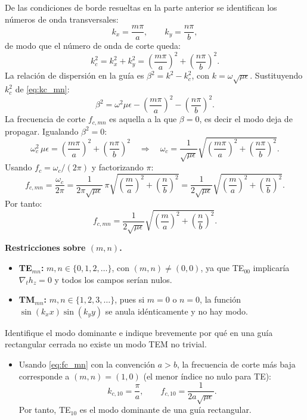 \documentclass[
  11pt,
  letterpaper,
   addpoints,
   answers
  ]{exam}
\begin{document}
\begin{questions}
\begin{parts}
\begin{subparts}
\begin{solution}
De las condiciones de borde resueltas en la parte anterior se identifican los números de onda transversales:
\[
k_x=\frac{m\pi}{a},\qquad k_y=\frac{n\pi}{b},
\]
de modo que el número de onda de corte queda:
\begin{equation}\label{eq:kc_mn}
  k_c^2 = k_x^2+k_y^2 = \left(\frac{m\pi}{a}\right)^2+\left(\frac{n\pi}{b}\right)^2.
\end{equation}
La relación de dispersión en la guía es $\beta^2=k^2-k_c^2$, con $k=\omega\sqrt{\mu\epsilon}$.
Sustituyendo $k_c^2$ de \eqref{eq:kc_mn}:
\[
\beta^2 = \omega^2\mu\epsilon - \left(\frac{m\pi}{a}\right)^2-\left(\frac{n\pi}{b}\right)^2.
\]
La frecuencia de corte $f_{c,mn}$ es aquella a la que $\beta=0$, es decir el modo deja de propagar.
Igualando $\beta^2=0$:
\[
\omega_c^2\,\mu\epsilon = \left(\frac{m\pi}{a}\right)^2+\left(\frac{n\pi}{b}\right)^2
\quad\Longrightarrow\quad
\omega_c = \frac{1}{\sqrt{\mu\epsilon}}\sqrt{\left(\frac{m\pi}{a}\right)^2+\left(\frac{n\pi}{b}\right)^2}.
\]
Usando $f_c=\omega_c/(2\pi)$ y factorizando $\pi$:
\[
f_{c,mn} = \frac{\omega_c}{2\pi}
= \frac{1}{2\pi\sqrt{\mu\epsilon}}\,\pi\sqrt{\left(\frac{m}{a}\right)^2+\left(\frac{n}{b}\right)^2}
= \frac{1}{2\sqrt{\mu\epsilon}}\sqrt{\left(\frac{m}{a}\right)^2+\left(\frac{n}{b}\right)^2}.
\]
Por tanto:
\begin{equation}\label{eq:fc_mn}
  \boxed{f_{c,mn}=\frac{1}{2\sqrt{\mu\epsilon}}
  \sqrt{\left(\frac{m}{a}\right)^2+\left(\frac{n}{b}\right)^2}.}
\end{equation}

\textbf{Restricciones sobre $(m,n)$.}
\begin{itemize}
\item \textbf{TE$_{mn}$:} $m,n\in\{0,1,2,\dots\}$, con $(m,n)\neq(0,0)$, ya que TE$_{00}$ implicaría $\nabla_t h_z=0$ y todos los campos serían nulos.
\item \textbf{TM$_{mn}$:} $m,n\in\{1,2,3,\dots\}$, pues si $m=0$ o $n=0$, la función $\sin(k_x x)\sin(k_y y)$ se anula idénticamente y no hay modo.
\end{itemize}
\end{solution}

\subpart Identifique el modo dominante e indique brevemente por qué en una guía rectangular cerrada no existe un modo TEM no trivial.

\begin{solution}
  \begin{itemize}
    \item  Usando \eqref{eq:fc_mn} con la convención $a>b$, la frecuencia de corte más baja corresponde a $(m,n)=(1,0)$
(el menor índice no nulo para TE):
\[
k_{c,10}=\frac{\pi}{a},\qquad
f_{c,10}=\frac{1}{2a\sqrt{\mu\epsilon}}.
\]
Por tanto, TE$_{10}$ es el modo dominante de una guía rectangular.


\end{itemize}
\end{solution}
\end{subparts}
\end{parts}
\end{questions}
\end{document}
